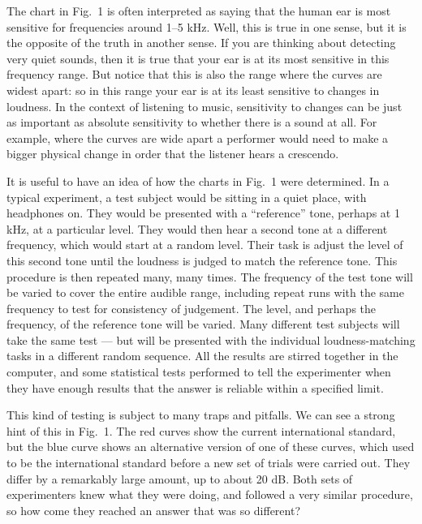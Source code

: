   The chart in Fig.\ 1 is often interpreted as saying that the human ear is 
  most sensitive for frequencies around 1--5 kHz. Well, this is true in one 
  sense, but it is the opposite of the truth in another sense. If you are 
  thinking about detecting very quiet sounds, then it is true that your ear is 
  at its most sensitive in this frequency range. But notice that this is also 
  the range where the curves are widest apart: so in this range your ear is at 
  its least sensitive to changes in loudness. In the context of listening to 
  music, sensitivity to changes can be just as important as absolute 
  sensitivity to whether there is a sound at all. For example, where the curves 
  are wide apart a performer would need to make a bigger physical change in 
  order that the listener hears a crescendo. 

  It is useful to have an idea of how the charts in Fig.\ 1 were determined. In 
  a typical experiment, a test subject would be sitting in a quiet place, with 
  headphones on. They would be presented with a ``reference'' tone, perhaps at 
  1 kHz, at a particular level. They would then hear a second tone at a 
  different frequency, which would start at a random level. Their task is 
  adjust the level of this second tone until the loudness is judged to match 
  the reference tone. This procedure is then repeated many, many times. The 
  frequency of the test tone will be varied to cover the entire audible range, 
  including repeat runs with the same frequency to test for consistency of 
  judgement. The level, and perhaps the frequency, of the reference tone will 
  be varied. Many different test subjects will take the same test --- but will 
  be presented with the individual loudness-matching tasks in a different 
  random sequence. All the results are stirred together in the computer, and 
  some statistical tests performed to tell the experimenter when they have 
  enough results that the answer is reliable within a specified limit. 

  This kind of testing is subject to many traps and pitfalls. We can see a 
  strong hint of this in Fig.\ 1. The red curves show the current international 
  standard, but the blue curve shows an alternative version of one of these 
  curves, which used to be the international standard before a new set of 
  trials were carried out. They differ by a remarkably large amount, up to 
  about 20 dB. Both sets of experimenters knew what they were doing, and 
  followed a very similar procedure, so how come they reached an answer that 
  was so different? 

